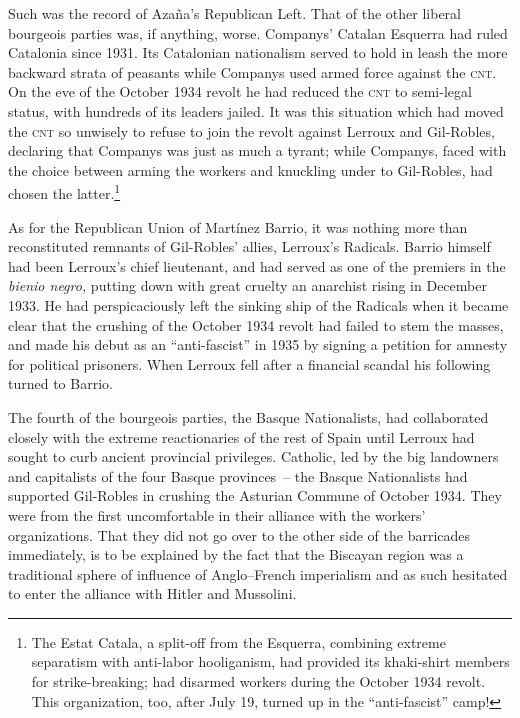 \indexLCompanys{}\indexCNT{}\indexGRobles\indexALerroux
Such was the record of Azaña’s Republican Left. That of the other liberal bourgeois parties was, if anything, worse. Companys’ Catalan Esquerra had ruled Catalonia since 1931. Its Catalonian nationalism served to hold in leash the more backward strata of peasants while Companys used armed force against the \textsc{cnt}. On the eve of the October 1934 revolt he had reduced the \textsc{cnt} to semi-legal status, with hundreds of its leaders jailed. It was this situation which had moved the \textsc{cnt} so unwisely to refuse to join the revolt against Lerroux and Gil-Robles, declaring that Companys was just as much a tyrant; while Companys, faced with the choice between arming the workers and knuckling under to Gil-Robles, had chosen the latter.\footnote{The Estat Catala, a split-off from the Esquerra, combining extreme separatism with anti-labor hooliganism, had provided its khaki-shirt members for strike-breaking; had disarmed workers during the October 1934 revolt. This organization, too, after July 19, turned up in the ``anti-fascist'' camp!}

As for the Republican Union of Mart\'inez Barrio,\indexDBarrio{} it was nothing more than reconstituted remnants of Gil-Robles’ allies, Lerroux’s Radicals. Barrio himself had been Lerroux’s chief lieutenant, and had served as one of the premiers in the \emph{bienio negro,} putting down with great cruelty an anarchist rising in December 1933. He had perspicaciously left the sinking ship of the Radicals when it became clear that the crushing of the October 1934 revolt had failed to stem the masses, and made his debut as an ``anti-fascist'' in 1935 by signing a petition for amnesty for political prisoners. When Lerroux{\indexALerroux} fell after a financial scandal his following turned to Barrio.

The fourth of the bourgeois parties, the Basque Nationalists, had collaborated closely with the extreme reactionaries of the rest of Spain until Lerroux had sought to curb ancient provincial privileges. Catholic, led by the big landowners and capitalists of the four Basque provinces~-- the Basque Nationalists had supported Gil-Robles in crushing the Asturian Commune of October 1934. They were from the first uncomfortable in their alliance with the workers’ organizations. That they did not go over to the other side of the barricades immediately, is to be explained by the fact that the Biscayan region was a traditional sphere of influence of Anglo--French imperialism and as such hesitated to enter the alliance with Hitler and Mussolini.

